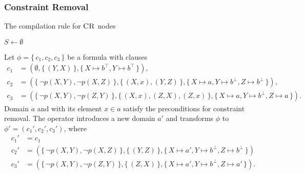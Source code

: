 \subsubsection{Constraint Removal} \label{sec:cr}

\begin{algorithm}
  \caption{The compilation rule for $\operatorname{\textsc{CR}}$ nodes}
  \label{alg:constraintremoval}
  $S \gets \emptyset$\;
\end{algorithm}


\begin{example}
  Let $\phi = \{\, c_1, c_2, c_3 \,\}$ be a formula with clauses
  \begin{align*}
    c_1 &= (\emptyset, \{\, (Y, X) \,\}, \{\, X \mapsto b^\top, Y \mapsto b^\top \,\}), \\
    c_2 &= (\{\, \neg p(X, Y), \neg p(X, Z) \,\}, \{\, (X, x), (Y, Z) \,\}, \{\, X \mapsto a, Y \mapsto b^\bot, Z \mapsto b^\bot \,\}), \\
    c_3 &= (\{\, \neg p(X, Y), \neg p(Z, Y) \,\}, \{\, (X, x), (Z, X), (Z, x) \,\}, \{\, X \mapsto a, Y \mapsto b^\bot, Z \mapsto a \,\}).
  \end{align*}
  Domain $a$ and with its element $x \in a$ satisfy the preconditions for constraint removal. The operator introduces a new domain $a'$ and transforms $\phi$ to $\phi' = (c_1', c_2', c_3')$, where
  \begin{align*}
    c_1' &= c_1 \\
    c_2' &= (\{\, \neg p(X, Y), \neg p(X, Z) \,\}, \{\, (Y, Z) \,\}, \{\, X \mapsto a', Y \mapsto b^\bot, Z \mapsto b^\bot \,\}) \\
    c_3' &= (\{\, \neg p(X, Y), \neg p(Z, Y) \,\}, \{\, (Z, X) \,\}, \{\, X \mapsto a', Y \mapsto b^\bot, Z \mapsto a' \,\}).
  \end{align*}
\end{example}

